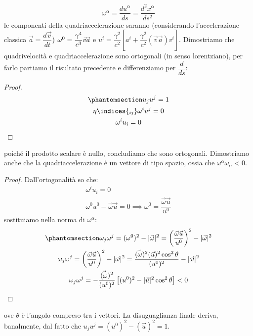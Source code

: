 \begin{equation}\label{eq:def_qacc}
    \omega^\alpha=\dfrac{du^\alpha}{ds}=\dfrac{d^2x^\alpha}{ds^2}
\end{equation}
le componenti della quadriaccelerazione saranno (considerando l'accelerazione classica $\Vec{a}=\dfrac{d\Vec{v}}{dt}$) $ \\\omega^0=\dfrac{\gamma^4}{c^3}\Vec{v}\Vec{a}$ e $u^i=\dfrac{\gamma^2}{c^2}[a^i+\dfrac{\gamma^2}{c^2}(\Vec{v}\Vec{a})v^i]$. Dimostriamo che quadrivelocità e quadriaccelerazione sono ortogonali (in senso lorentziano), per farlo partiamo il risultato precedente e differenziamo per $\dfrac{d}{ds}$:
\begin{proof}
\begin{equation}
        \begin{gathered}\phantomsection\label{eq:Orto_Vel_Acc}
      u_ju^j=1 \\
\eta\indices{_{ij}}\omega^iu^j=0 \\
\omega^iu_i=0
\end{gathered}
\end{equation}
\end{proof}
poiché il prodotto scalare è nullo, concludiamo che sono ortogonali.
Dimostriamo anche che la quadriaccelerazione è un vettore di tipo spazio, ossia che $\omega^\alpha\omega_\alpha<0$. 
 \begin{proof}
     Dall'ortogonalità so che:
\begin{gather*}
\omega^iu_i=0\\
\omega^0u^0-\Vec{\omega}\Vec{u}=0  \implies \omega^0=\dfrac{\Vec{\omega}\Vec{u}}{u^0}
\end{gather*}
sostituiamo nella norma di $\omega^\alpha$:
\begin{equation}
    \begin{gathered}\phantomsection\label{eq:seg_Acc}
      \omega_j\omega^j=(\omega^0)^2-|\vec{\omega}|^2=\left(\dfrac{\Vec{\omega}\Vec{u}}{u^0}\right) ^2 -|\vec{\omega}|^2 \\
\omega_j\omega^j=\left(\dfrac{\Vec{\omega}\Vec{u}}{u^0}\right)^2 -|\vec{\omega}|^2=\dfrac{\Vec{(\omega})^2(\Vec{u})^2\cos^2{\theta}}{(u^0)^2} -|\vec{\omega}|^2 \\
\omega_j\omega^j=-\dfrac{\Vec{(\omega})^2}{(u^0)^2}\left[(u^0)^2-|\vec{u}|^2\cos^2{\theta}\right]<0
\end{gathered}
\end{equation}

 \end{proof}
 ove $\theta$ è l'angolo compreso tra i vettori. La disuguaglianza finale deriva, banalmente, dal fatto che $u_ju^j=(u^0)^2-(\Vec{u})^2=1 $.
 
